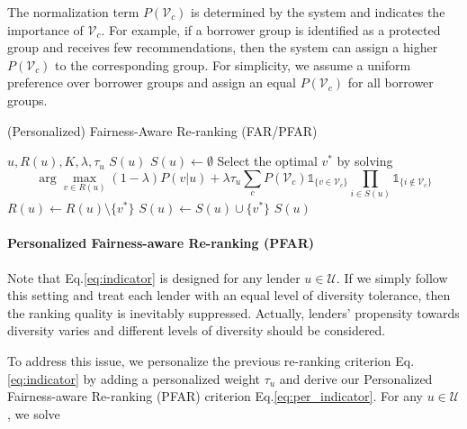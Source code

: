 The normalization term $P(\mathcal V_c)$ is determined by the system and indicates the importance of $\mathcal V_c$. For example, if a borrower group is identified as a protected group and receives few recommendations, then the system can assign a higher $P(\mathcal V_c)$ to the corresponding group. For simplicity, we assume a uniform preference over borrower groups and assign an equal $P(\mathcal V_c)$ for all borrower groups.



\begin{algorithm}[t]
\caption{(Personalized) Fairness-Aware Re-ranking (FAR/PFAR)}
\begin{algorithmic}[1]
\REQUIRE $u,R(u),K,\lambda, \tau_u$
\ENSURE $S(u)$
\STATE $S(u)\leftarrow\emptyset$
\STATE Select the optimal $v^*$ by solving $$\arg\max_{v\in R(u)}(1-\lambda)P(v|u)+\lambda\tau_u \sum_{c}P(\mathcal V_c)\mathds{1}_{\{v\in \mathcal V_c\}}\prod_{i\in S(u)}\mathds{1}_{\{i\notin \mathcal V_c\}}$$
\STATE $R(u)\leftarrow R(u)\setminus \{v^*\}$
\STATE $S(u)\leftarrow S(u)\cup\{v^*\}$
\ENDWHILE
\RETURN $S(u)$
\end{algorithmic}
\label{alg:main}
\end{algorithm}

\paragraph{\textbf{Personalized Fairness-aware Re-ranking (PFAR)}}
Note that Eq.\eqref{eq:indicator} is designed for any lender $u\in \mathcal U$. If we simply follow this setting and treat each lender with an equal level of diversity tolerance, then the ranking quality is inevitably suppressed. Actually, lenders' propensity towards diversity varies and different levels of diversity should be considered.

To address this issue, we personalize the previous re-ranking criterion Eq.\eqref{eq:indicator} by adding a personalized weight $\tau_u$ and derive our Personalized Fairness-aware Re-ranking (PFAR) criterion Eq.\eqref{eq:per_indicator}. 
For any $u\in \mathcal U$, we solve

